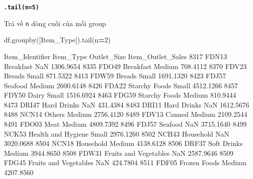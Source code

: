 \documentclass[
]{book}
\newenvironment{Shaded}{\begin{snugshade}}{\end{snugshade}}
\newcommand{\DecValTok}[1]{\textcolor[rgb]{0.00,0.00,0.81}{#1}}
\newcommand{\NormalTok}[1]{#1}
\newcommand{\OperatorTok}[1]{\textcolor[rgb]{0.81,0.36,0.00}{\textbf{#1}}}
\newcommand{\StringTok}[1]{\textcolor[rgb]{0.31,0.60,0.02}{#1}}
\begin{document}
\textbf{\texttt{.tail(n=5)}}

Trả về \texttt{n} dòng cuối của mỗi group

\begin{Shaded}
\begin{Highlighting}[]
\NormalTok{df.groupby([}\StringTok{\textquotesingle{}Item\_Type\textquotesingle{}}\NormalTok{]).tail(n}\OperatorTok{=}\DecValTok{2}\NormalTok{)}
\end{Highlighting}
\end{Shaded}

\begin{Shaded}
\begin{Highlighting}[]
\NormalTok{     Item\_Identifier              Item\_Type Outlet\_Size  Item\_Outlet\_Sales}
\NormalTok{8317           FDN13              Breakfast         NaN          1306.9654}
\NormalTok{8335           FDO49              Breakfast      Medium           708.4112}
\NormalTok{8370           FDV23                 Breads       Small           871.5322}
\NormalTok{8413           FDW59                 Breads       Small          1691.1320}
\NormalTok{8423           FDJ57                Seafood      Medium          2600.6148}
\NormalTok{8426           FDA22          Starchy Foods       Small          4512.1266}
\NormalTok{8457           FDY50                  Dairy       Small          1516.6924}
\NormalTok{8463           FDG59          Starchy Foods      Medium           810.9444}
\NormalTok{8473           DRI47            Hard Drinks         NaN           431.4384}
\NormalTok{8483           DRI11            Hard Drinks         NaN          1612.5676}
\NormalTok{8488           NCN14                 Others      Medium          2756.4120}
\NormalTok{8489           FDV13                 Canned      Medium          2109.2544}
\NormalTok{8491           FDO03                   Meat      Medium          4809.7392}
\NormalTok{8496           FDJ57                Seafood         NaN          3715.1640}
\NormalTok{8499           NCK53     Health and Hygiene       Small          2976.1260}
\NormalTok{8502           NCH43              Household         NaN          3020.0688}
\NormalTok{8504           NCN18              Household      Medium          4138.6128}
\NormalTok{8506           DRF37            Soft Drinks      Medium          3944.8650}
\NormalTok{8508           FDW31  Fruits and Vegetables         NaN          2587.9646}
\NormalTok{8509           FDG45  Fruits and Vegetables         NaN           424.7804}
\NormalTok{8511           FDF05           Frozen Foods      Medium          4207.8560}

\end{Highlighting}
\end{Shaded}
\end{document}
